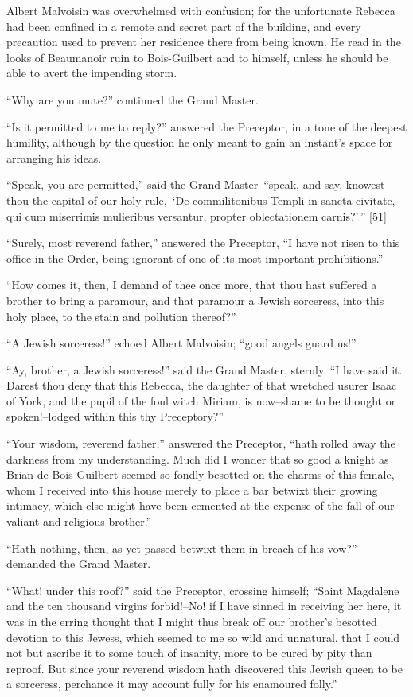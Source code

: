 Albert Malvoisin was overwhelmed with confusion; for the unfortunate
Rebecca had been confined in a remote and secret part of the building,
and every precaution used to prevent her residence there from being
known. He read in the looks of Beaumanoir ruin to Bois-Guilbert and to
himself, unless he should be able to avert the impending storm.

``Why are you mute?'' continued the Grand Master.

``Is it permitted to me to reply?'' answered the Preceptor, in a tone of
the deepest humility, although by the question he only meant to gain an
instant's space for arranging his ideas.

``Speak, you are permitted,'' said the Grand Master--``speak, and say,
knowest thou the capital of our holy rule,--`De commilitonibus Templi in
sancta civitate, qui cum miserrimis mulieribus versantur, propter
oblectationem carnis?'\,'' {[}51{]}

``Surely, most reverend father,'' answered the Preceptor, ``I have not
risen to this office in the Order, being ignorant of one of its most
important prohibitions.''

``How comes it, then, I demand of thee once more, that thou hast
suffered a brother to bring a paramour, and that paramour a Jewish
sorceress, into this holy place, to the stain and pollution thereof?''

``A Jewish sorceress!'' echoed Albert Malvoisin; ``good angels guard
us!''

``Ay, brother, a Jewish sorceress!'' said the Grand Master, sternly. ``I
have said it. Darest thou deny that this Rebecca, the daughter of that
wretched usurer Isaac of York, and the pupil of the foul witch Miriam,
is now--shame to be thought or spoken!--lodged within this thy
Preceptory?''

``Your wisdom, reverend father,'' answered the Preceptor, ``hath rolled
away the darkness from my understanding. Much did I wonder that so good
a knight as Brian de Bois-Guilbert seemed so fondly besotted on the
charms of this female, whom I received into this house merely to place a
bar betwixt their growing intimacy, which else might have been cemented
at the expense of the fall of our valiant and religious brother.''

``Hath nothing, then, as yet passed betwixt them in breach of his vow?''
demanded the Grand Master.

``What! under this roof?'' said the Preceptor, crossing himself; ``Saint
Magdalene and the ten thousand virgins forbid!--No! if I have sinned in
receiving her here, it was in the erring thought that I might thus break
off our brother's besotted devotion to this Jewess, which seemed to me
so wild and unnatural, that I could not but ascribe it to some touch of
insanity, more to be cured by pity than reproof. But since your reverend
wisdom hath discovered this Jewish queen to be a sorceress, perchance it
may account fully for his enamoured folly.''

